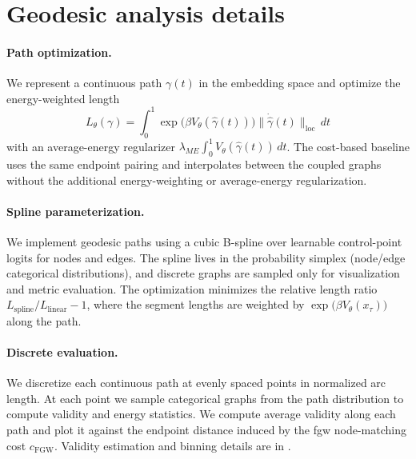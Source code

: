 \section{Geodesic analysis details}
\label{app:geodesic-details}

\paragraph{Path optimization.}
We represent a continuous path $\gamma(t)$ in the embedding space and optimize the energy-weighted length
\begin{equation}
L_\theta(\gamma)=\int_0^1 \exp\!\big(\beta V_\theta(\hat{\gamma}(t))\big)\|\dot{\hat{\gamma}}(t)\|_{\mathrm{loc}}\,dt
\end{equation}
with an average-energy regularizer $\lambda_{ME}\int_0^1 V_\theta(\hat{\gamma}(t))\,dt$. The cost-based
baseline uses the same endpoint pairing and interpolates between the coupled graphs without the additional energy-weighting or average-energy regularization.

\paragraph{Spline parameterization.}
We implement geodesic paths using a cubic B-spline over learnable control-point logits for nodes and
edges. The spline lives in the probability simplex (node/edge categorical distributions), and
discrete graphs are sampled only for visualization and metric evaluation. The optimization minimizes
the relative length ratio $L_{\mathrm{spline}}/L_{\mathrm{linear}} - 1$, where the segment lengths are
weighted by $\exp\!\big(\beta V_\theta(x_\tau)\big)$ along the path.

\paragraph{Discrete evaluation.}
We discretize each continuous path at evenly spaced points in normalized arc length. At each point
we sample categorical graphs from the path distribution to compute validity and energy statistics.
We compute average validity along each path and plot it against the endpoint distance induced by the
\gls{fgw} node-matching cost $c_{\mathrm{FGW}}$.
Validity estimation and binning details are in .
